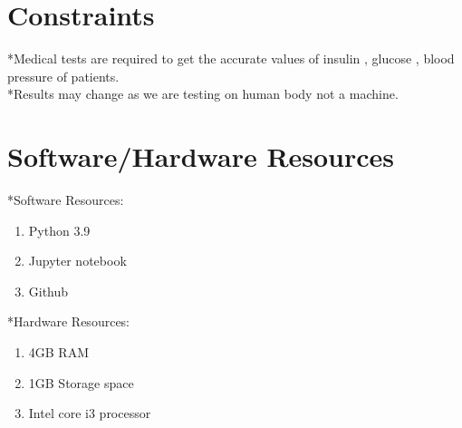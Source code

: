\documentclass[pdftex,a4paper,11pt,oneside,openright]{report}
\begin{document}
\chapter{Constraints}
\Large{*Medical tests are required to get the accurate values of insulin , glucose , blood pressure of patients.}\\
\Large{*Results may change as we are testing on human body not a machine.}

\chapter{Software/Hardware Resources}
\Large{*Software Resources:}
\begin{enumerate}
    \item Python 3.9
    \item Jupyter notebook
    \item Github
\end{enumerate}
\Large{*Hardware Resources:}
\begin{enumerate}
    \item 4GB RAM
    \item 1GB Storage space
    \item Intel core i3 processor
\end{enumerate}

\end{document}
